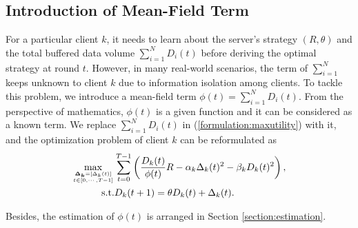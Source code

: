 \documentclass{article}
\theoremstyle{plain}
\theoremstyle{definition}
\theoremstyle{remark}
\begin{document}
\subsection{Introduction of Mean-Field Term}
\label{section:mean-field term}
For a particular client $k$, it needs to learn about the server's strategy $(R, \theta)$ and the total buffered data volume $\sum_{i=1}^N D_i(t)$ before deriving the optimal strategy at round $t$.
However, in many real-world scenarios, the term of $\sum_{i=1}^{N}$ keeps unknown to client $k$ due to information isolation among clients.
To tackle this problem, we introduce a mean-field term $\phi(t)=\sum_{i=1}^{N} D_i(t)$. From the perspective of mathematics, $\phi(t)$ is a given function and it can be considered as a known term.
We replace $\sum_{i=1}^{N} D_i(t)$ in (\ref{formulation:maxutility}) with it, and the optimization problem of client $k$ can be reformulated as
\begin{align}
  \label{formulation:reformulated}
  \max_{\boldsymbol{\Delta_k}=[\Delta_k(t)] \atop t \in [0,\cdots,T-1]} & \sum_{t=0}^{T-1} \left(\frac{D_k(t)}{\phi(t)}R - \alpha_k\Delta_k(t)^2 - \beta_kD_k(t)^2\right), \notag \\
  \text{s.t.} & D_k(t+1) = \theta D_k(t) + \Delta_k(t).
\end{align}


Besides, the estimation of $\phi(t)$ is arranged in Section \ref{section:estimation}.
\end{document}
